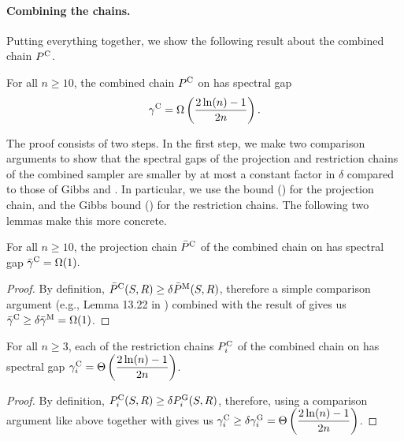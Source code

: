\paragraph{Combining the chains.}
Putting everything together, we show the following result about the combined chain $P^{\mathrm{C}}$.
\begin{theorem} \label{thm:combo}
  For all $n \geq 10$, the combined chain $P^{\mathrm{C}}$ on \ising{} has spectral gap
  \begin{align*}
    \gamma^{\mathrm{C}} = \Omega\left( \displaystyle\frac{2\ln(n) - 1}{2n} \right).
  \end{align*}
\end{theorem}
\noindent The proof consists of two steps.
In the first step, we make two comparison arguments \citep{diaconis93,levin08book} to show that the spectral gaps of the projection and restriction chains of the combined sampler are smaller by at most a constant factor in $\delta$ compared to those of Gibbs and \Ms{}.
In particular, we use the \Ms{} bound () for the projection chain, and the Gibbs bound () for the restriction chains.
The following two lemmas make this more concrete.

\begin{lemma} \label{lem:cproj}
  For all $n \geq 10$, the projection chain $\bar{P}^{\mathrm{C}}$ of the combined chain on \ising{} has spectral gap $\bar{\gamma}^{\mathrm{C}} = \Omega(1).$
\end{lemma}

\begin{proof}
  By definition, $\bar{P}^{\mathrm{C}}(S, R) \geq \delta \bar{P}^{\mathrm{M}}(S, R)$, therefore a simple comparison argument (e.g., Lemma 13.22 in \citep{levin08book}) combined with the result of  gives us $\bar{\gamma}^{\mathrm{C}} \geq \delta \bar{\gamma}^{\mathrm{M}} = \Omega(1)$.
\end{proof}

\begin{lemma} \label{lem:crest}
  For all $n \geq 3$, each of the restriction chains $P^{\mathrm{C}}_i$ of the combined chain on \ising{} has spectral gap $\gamma^{\mathrm{C}}_i = \Theta\left(\displaystyle\frac{2\ln(n) - 1}{2n}\right)$.
\end{lemma}

\begin{proof}
  By definition, $P^{\mathrm{C}}_i(S, R) \geq \delta P^{\mathrm{G}}_i(S, R)$, therefore, using a comparison argument like above together with  gives us $\gamma^{\mathrm{C}}_i \geq \delta \gamma^{\mathrm{G}}_i = \Theta\left(\displaystyle\frac{2\ln(n) - 1}{2n}\right)$.
\end{proof}


